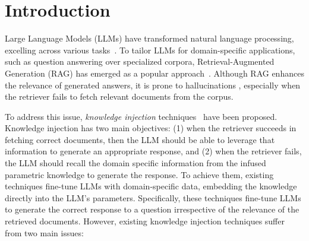 \section{Introduction} \label{sec:intro}
Large Language Models (LLMs) have transformed natural language processing, excelling across various tasks~\citep{NEURIPS2020_1457c0d6}. To tailor LLMs for domain-specific applications, such as question answering over specialized corpora, Retrieval-Augmented Generation (RAG) has emerged as a popular approach~\citep{lewis2020retrieval, karpukhin2020dense}. Although RAG enhances the relevance of generated answers, it is prone to hallucinations \citep{ji-etal-2023-survey, nandwani-etal-2023-pointwise}, especially when the retriever fails to fetch relevant documents from the corpus.


To address this issue, \textit{knowledge injection} techniques~\citep{zhang2024raft,yoran2023making} have been proposed. 
Knowledge injection has two main objectives: (1) when the retriever succeeds in fetching correct documents, then the LLM should be able to leverage that information to generate an appropriate response, and (2) when the retriever fails, the LLM should recall the domain specific information from the infused parametric knowledge to generate the response.
To achieve them, existing techniques fine-tune LLMs with domain-specific data, embedding the knowledge directly into the LLM's parameters. Specifically, these techniques fine-tune LLMs to generate the correct response to a question irrespective of the relevance of the retrieved documents.
However, existing knowledge injection techniques suffer from two main issues:

